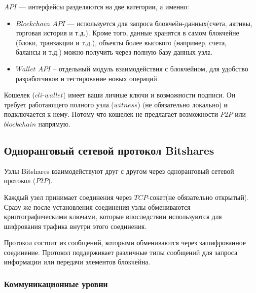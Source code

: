 \documentclass[a4paper, 14pt]{extarticle}
\begin{document}
$API$ --- интерфейсы разделяются на две категории, а именно:

\begin{itemize}
    \item $Blockchain$ $API$ --- используется для запроса блокчейн-данных(счета, активы, торговая история и т.д.). Кроме того, данные хранятся в самом блокчейне (блоки, транзакции и т.д.), объекты более высокого  (например, счета, балансы и т.д.) можно получить через полную базу данных узла.
    \item $Wallet$ $API$ – отдельный модуль взаимодействия с блокчейном, для удобство разработчиков и тестирование новых операций.
\end{itemize}

Кошелек ($cli$-$wallet$) имеет ваши личные ключи и возможности подписи. Он требует работающего полного узла ($witness$) (не обязательно локально) и подключается к нему. Потому что кошелек не предлагает возможности $P2P$ или $blockchain$ напрямую.

\subsection{Одноранговый сетевой протокол Bitshares}
Узлы Bitshares взаимодействуют друг с другом через одноранговый сетевой протокол ($P2P$).

Каждый узел принимает соединения через $TCP$-сокет(не обязательно открытый). Сразу же после установления соединения узлы обмениваются криптографическими ключами, которые впоследствии используются для шифрования трафика внутри этого соединения.

Протокол состоит из сообщений, которыми обмениваются через зашифрованное соединение. Протокол поддерживает различные типы сообщений для запроса информации или передачи элементов блокчейна.

\subsubsection{Коммуникационные уровни}
\end{document}
